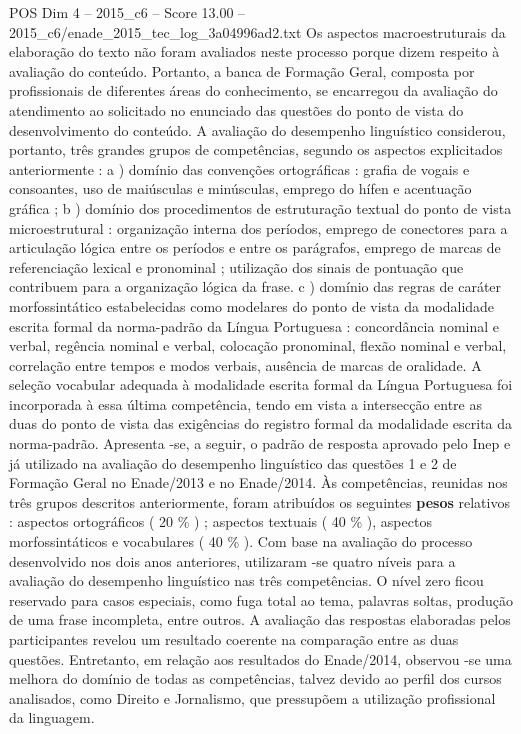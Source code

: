 \begin{textsample}{POS Dim 4 – 2015\_c6 – Score 13.00 – 2015\_c6/enade\_2015\_tec\_log\_3a04996ad2.txt}
Os aspectos macroestruturais da elaboração do texto não foram avaliados neste processo porque dizem respeito à avaliação do conteúdo.
Portanto, a banca de Formação Geral, composta por profissionais de diferentes áreas do conhecimento, se encarregou da avaliação do atendimento ao solicitado no enunciado das questões do ponto de vista do desenvolvimento do conteúdo.
A avaliação do desempenho linguístico considerou, portanto, três grandes grupos de competências, segundo os aspectos explicitados anteriormente : a ) domínio das convenções ortográficas : grafia de vogais e consoantes, uso de maiúsculas e minúsculas, emprego do hífen e acentuação gráfica ; b ) domínio dos procedimentos de estruturação textual do ponto de vista microestrutural : organização interna dos períodos, emprego de conectores para a articulação lógica entre os períodos e entre os parágrafos, emprego de marcas de referenciação lexical e pronominal ; utilização dos sinais de pontuação que contribuem para a organização lógica da frase. c ) domínio das regras de caráter morfossintático estabelecidas como modelares do ponto de vista da modalidade escrita formal da norma-padrão da Língua Portuguesa : concordância nominal e verbal, regência nominal e verbal, colocação pronominal, flexão nominal e verbal, correlação entre tempos e modos verbais, ausência de marcas de oralidade.
A seleção vocabular adequada à modalidade escrita formal da Língua Portuguesa foi incorporada à essa última competência, tendo em vista a intersecção entre as duas do ponto de vista das exigências do registro formal da modalidade escrita da norma-padrão.
Apresenta -se, a seguir, o padrão de resposta aprovado pelo Inep e já utilizado na avaliação do desempenho linguístico das questões 1 e 2 de Formação Geral no Enade/2013 e no Enade/2014.
Às competências, reunidas nos três grupos descritos anteriormente, foram atribuídos os seguintes \textbf{pesos} relativos : aspectos ortográficos ( 20 \% ) ; aspectos textuais ( 40 \% ), aspectos morfossintáticos e vocabulares ( 40 \% ).
Com base na avaliação do processo desenvolvido nos dois anos anteriores, utilizaram -se quatro níveis para a avaliação do desempenho linguístico nas três competências.
O nível zero ficou reservado para casos especiais, como fuga total ao tema, palavras soltas, produção de uma frase incompleta, entre outros.
A avaliação das respostas elaboradas pelos participantes revelou um resultado coerente na comparação entre as duas questões.
Entretanto, em relação aos resultados do Enade/2014, observou -se uma melhora do domínio de todas as competências, talvez devido ao perfil dos cursos analisados, como Direito e Jornalismo, que pressupõem a utilização profissional da linguagem.

\end{textsample}
